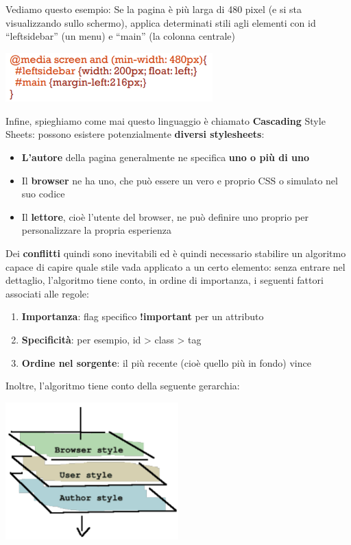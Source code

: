 \documentclass[12pt]{article}
\begin{document}
Vediamo questo esempio: Se la pagina è più larga di 480 pixel (e si sta visualizzando sullo schermo), applica determinati stili agli elementi con id “leftsidebar” (un menu) e “main” (la colonna centrale)
\begin{center}
    \includegraphics[width = 0.60\textwidth]{Images/161.PNG}
\end{center}
Infine, spieghiamo come mai questo linguaggio è chiamato \textbf{Cascading} Style Sheets: possono esistere
potenzialmente \textbf{diversi stylesheets}:
\begin{itemize}
    \item \textbf{L'autore} della pagina generalmente ne specifica \textbf{uno o più di uno}
    \item Il \textbf{browser} ne ha uno, che può essere un vero e proprio CSS o simulato nel suo codice
    \item Il \textbf{lettore}, cioè l'utente del browser, ne può definire uno proprio per personalizzare la propria esperienza
\end{itemize}
Dei \textbf{conflitti} quindi sono inevitabili ed è quindi necessario stabilire un algoritmo capace di capire quale stile vada applicato a un certo elemento:
senza entrare nel dettaglio, l'algoritmo tiene conto, in ordine di importanza, i seguenti fattori associati alle regole:
\begin{enumerate}
    \item \textbf{Importanza}: flag specifico \textbf{!important} per un attributo
    \item \textbf{Specificità}: per esempio, id > class > tag
    \item \textbf{Ordine nel sorgente}: il più recente (cioè quello più in fondo) vince
\end{enumerate}
Inoltre, l'algoritmo tiene conto della seguente gerarchia:
\begin{center}
    \includegraphics[width = 0.50\textwidth]{Images/162.PNG}
\end{center}
\end{document}
